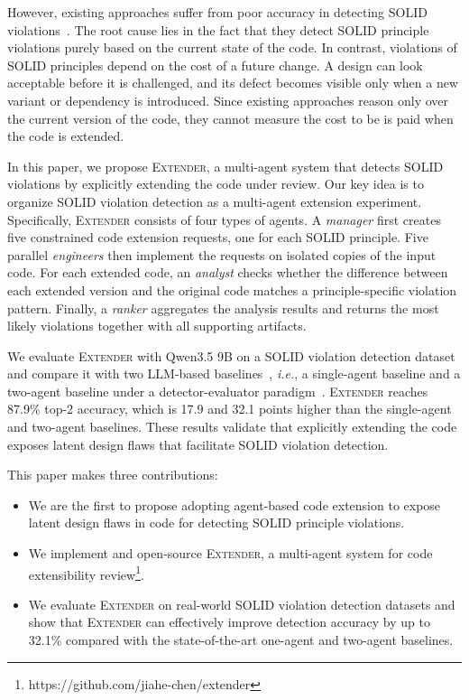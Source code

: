 \documentclass[sigconf,screen]{acmart}
\newcommand{\tool}{\textsc{Extender}\xspace}
\newcommand{\ie}{{\em i.e.},\xspace}
\begin{document}
However, existing approaches suffer from poor accuracy in detecting SOLID violations~\cite{Martins2024,Pehlivan2025}.
The root cause lies in the fact that they detect SOLID principle violations purely based on the current state of the code.
In contrast, violations of SOLID principles depend on the cost of a future change.
A design can look acceptable before it is challenged, and its defect becomes visible only when a new variant or dependency is introduced.
Since existing approaches reason only over the current version of the code, they cannot measure the cost to be is paid when the code is extended.


In this paper, we propose \tool, a multi-agent system that detects SOLID violations by explicitly extending the code under review.
Our key idea is to organize SOLID violation detection as a multi-agent extension experiment.
Specifically, \tool consists of four types of agents.
A \textit{manager} first creates five constrained code extension requests, one for each SOLID principle.
Five parallel \textit{engineers} then implement the requests on isolated copies of the input code.
For each extended code, an \textit{analyst} checks whether the difference between each extended version and the original code matches a principle-specific violation pattern.
Finally, a \textit{ranker} aggregates the analysis results and returns the most likely violations together with all supporting artifacts.

We evaluate \tool with Qwen3.5 9B on a SOLID violation detection dataset~\cite{Pehlivan2025} and compare it with two LLM-based baselines~\cite{Pehlivan2025,Melo2025}, \ie a single-agent baseline and a two-agent baseline under a detector-evaluator paradigm~\cite{Melo2025}. 
\tool reaches 87.9\% top-2 accuracy, which is 17.9 and 32.1 points higher than the single-agent and two-agent baselines.
These results validate that explicitly extending the code exposes latent design flaws that facilitate SOLID violation detection.

This paper makes three contributions:
\begin{itemize}
  \item We are the first to propose adopting agent-based code extension to expose latent design flaws in code for detecting SOLID principle violations. 
  \item We implement and open-source \tool, a multi-agent system for code extensibility review\footnote{https://github.com/jiahe-chen/extender}. 
  \item We evaluate \tool on real-world SOLID violation detection datasets and show that \tool can effectively improve detection accuracy by up to 32.1\% compared with the state-of-the-art one-agent and two-agent baselines.
\end{itemize}
\end{document}
